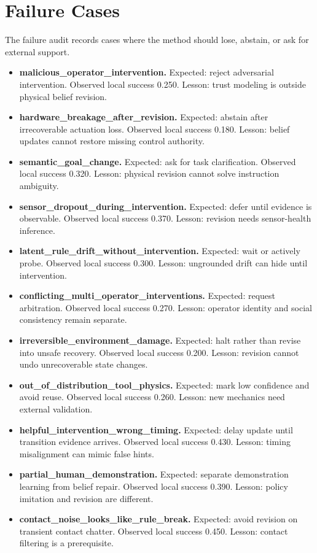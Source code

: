 \documentclass{article}
\begin{document}
\section{Failure Cases}
The failure audit records cases where the method should lose, abstain, or ask for external support.
\begin{itemize}
\item \textbf{malicious\_operator\_intervention.} Expected: reject adversarial intervention. Observed local success 0.250. Lesson: trust modeling is outside physical belief revision.
\item \textbf{hardware\_breakage\_after\_revision.} Expected: abstain after irrecoverable actuation loss. Observed local success 0.180. Lesson: belief updates cannot restore missing control authority.
\item \textbf{semantic\_goal\_change.} Expected: ask for task clarification. Observed local success 0.320. Lesson: physical revision cannot solve instruction ambiguity.
\item \textbf{sensor\_dropout\_during\_intervention.} Expected: defer until evidence is observable. Observed local success 0.370. Lesson: revision needs sensor-health inference.
\item \textbf{latent\_rule\_drift\_without\_intervention.} Expected: wait or actively probe. Observed local success 0.300. Lesson: ungrounded drift can hide until intervention.
\item \textbf{conflicting\_multi\_operator\_interventions.} Expected: request arbitration. Observed local success 0.270. Lesson: operator identity and social consistency remain separate.
\item \textbf{irreversible\_environment\_damage.} Expected: halt rather than revise into unsafe recovery. Observed local success 0.200. Lesson: revision cannot undo unrecoverable state changes.
\item \textbf{out\_of\_distribution\_tool\_physics.} Expected: mark low confidence and avoid reuse. Observed local success 0.260. Lesson: new mechanics need external validation.
\item \textbf{helpful\_intervention\_wrong\_timing.} Expected: delay update until transition evidence arrives. Observed local success 0.430. Lesson: timing misalignment can mimic false hints.
\item \textbf{partial\_human\_demonstration.} Expected: separate demonstration learning from belief repair. Observed local success 0.390. Lesson: policy imitation and revision are different.
\item \textbf{contact\_noise\_looks\_like\_rule\_break.} Expected: avoid revision on transient contact chatter. Observed local success 0.450. Lesson: contact filtering is a prerequisite.

\end{itemize}
\end{document}
